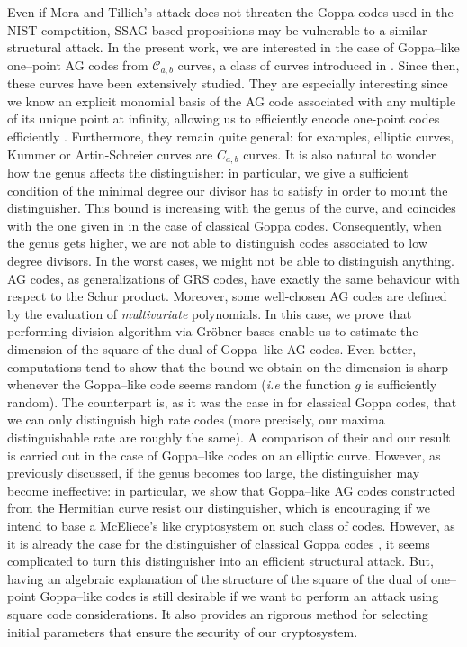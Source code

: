 \documentclass[a4paper]{article}
\theoremstyle{definition}
\theoremstyle{remark}
\newcommand{\calC}{\mathcal{C}}
\begin{document}
Even if Mora and Tillich's attack does not threaten the Goppa codes used in the NIST competition, SSAG-based propositions may be vulnerable to a similar structural attack. 
In the present work, we are interested in the case of Goppa--like one--point AG codes from $\calC_{a,b}$ curves, a class of curves introduced in \cite{Miu93}. Since then, these curves have been extensively studied. They are especially interesting since we know an explicit monomial basis of the AG code associated with any multiple of its unique point at infinity, allowing us to efficiently encode one-point codes  efficiently \cite{BRS21}. Furthermore, they remain quite general: for examples, elliptic curves, Kummer or Artin-Schreier curves are $C_{a,b}$ curves. It is also natural to wonder how the genus affects the distinguisher: in particular, we give a sufficient condition of the minimal degree our divisor has to satisfy in order to mount the distinguisher. This bound is increasing with the genus of the curve, and coincides with the one given in \cite{MT21} in the case of classical Goppa codes. Consequently, when the genus gets higher, we are not able to distinguish codes associated to low degree divisors. In the worst cases, we might not be able to distinguish anything.
AG codes, as generalizations of GRS codes, have exactly the same behaviour with respect to the Schur product. Moreover, some well-chosen AG codes are defined by the evaluation of \textit{multivariate} polynomials. In this case, we prove that performing division algorithm via Gr\"obner bases enable us to estimate the dimension of the square of the dual of Goppa--like AG codes. Even better, computations tend to show that the bound we obtain on the dimension is sharp whenever the Goppa--like code seems random (\emph{i.e} the function $g$ is sufficiently random). The counterpart is, as it was the case in \cite{MT21} for classical Goppa codes, that we can only distinguish high rate codes (more precisely, our maxima distinguishable rate are roughly the same). A comparison of their and our result is carried out in the case of Goppa--like codes on an elliptic curve. However, as previously discussed, if the genus becomes too large, the distinguisher may become ineffective: in particular, we show that Goppa--like AG codes constructed from the Hermitian curve resist our distinguisher, which is encouraging if we intend to base a McEliece's like cryptosystem on such class of codes.
However, as it is already the case for the distinguisher of classical Goppa codes \cite{MT21}, it seems complicated to turn this distinguisher into an efficient structural attack. But, having an algebraic explanation of the structure of the square of the dual of one--point Goppa--like codes is still desirable if we want to perform an attack using square code considerations. It also provides an rigorous method for selecting initial parameters that ensure the security of our cryptosystem.
\end{document}
